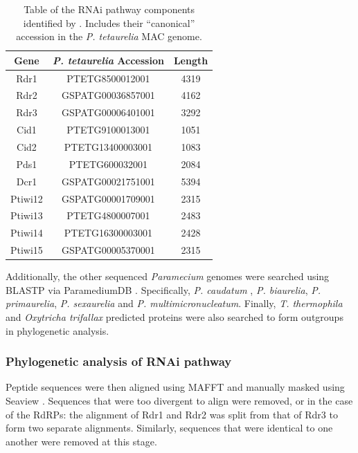 \begin{table}
    \centering
    \begin{tabular}{|c|c|c|}
        \hline
        \textbf{Gene} & \textbf{\textit{P. tetaurelia} Accession} & \textbf{Length} \\
        \hline
        Rdr1 & PTETG8500012001 & 4319 \\ 
        Rdr2 & GSPATG00036857001 & 4162 \\
        Rdr3 & GSPATG00006401001 & 3292 \\
        Cid1 & PTETG9100013001 & 1051 \\
        Cid2 & PTETG13400003001 & 1083 \\
        Pds1 & PTETG600032001 & 2084 \\
        Dcr1 & GSPATG00021751001 & 5394 \\
        Ptiwi12 & GSPATG00001709001 & 2315 \\
        Ptiwi13 & PTETG4800007001 & 2483 \\
        Ptiwi14 & PTETG16300003001 & 2428 \\
        Ptiwi15 & GSPATG00005370001 & 2315 \\
        \hline
    \end{tabular}
    \caption[RNAi pathway components from \citep{Marker2014}]{Table of
    the RNAi pathway components identified by \citep{Marker2014}. 
    Includes their ``canonical'' accession in the \textit{P. tetaurelia}
MAC genome.}
    \label{tab:rnai_seeds}
\end{table}

Additionally, the other sequenced \textit{Paramecium} genomes 
were searched using BLASTP via ParamediumDB \citep{Arnaiz2007,Arnaiz2011a}.
Specifically, \textit{P. caudatum} \citep{McGrath2014}, 
\textit{P. biaurelia}, \textit{P. primaurelia}, \textit{P. sexaurelia}
and \textit{P. multimicronucleatum}. Finally,  \textit{T. thermophila} \citep{Eisen2006}
and \textit{Oxytricha trifallax} \citep{Swart2013}
predicted proteins were also searched to form outgroups in phylogenetic
analysis.

\subsubsection{Phylogenetic analysis of RNAi pathway}

Peptide sequences were then aligned using MAFFT \citep{Katoh2002} and manually
masked using Seaview \citep{Gouy2010}.
Sequences that were too divergent to align were removed, or in the case
of the RdRPs: the alignment of Rdr1 and Rdr2 was split from that of Rdr3 to form
two separate alignments.  Similarly, sequences that were identical
to one another were removed at this stage. 

